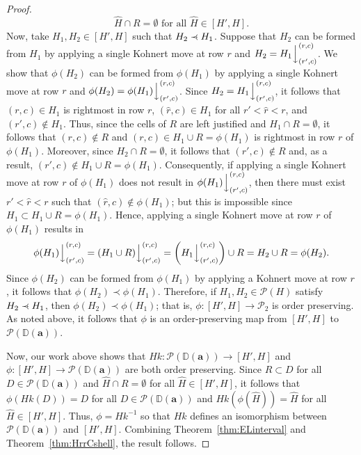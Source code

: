 \documentclass[letterpaper,10pt]{article}
\newcommand{\ldownarrow}{\Big\downarrow}
\newcommand{\precdot}{\prec\mathrel{\mkern-5mu}\mathrel{\cdot}}
\begin{document}
\begin{proof}
    $$\widehat{H}\cap R=\emptyset\text{ for all }\widehat{H}\in [H',H].$$ Now, take $H_1,H_2\in [H',H]$ such that $H_2\precdot H_1$. Suppose that $H_2$ can be formed from $H_1$ by applying a single Kohnert move at row $r$ and $H_2=H_1\ldownarrow^{(r,c)}_{(r',c)}$. We show that $\phi(H_2)$ can be formed from $\phi(H_1)$ by applying a single Kohnert move at row $r$ and $\phi(H_2)=\phi(H_1)\ldownarrow^{(r,c)}_{(r',c)}$. Since $H_2=H_1\ldownarrow^{(r,c)}_{(r',c)}$, it follows that $(r,c)\in H_1$ is rightmost in row $r$, $(\widehat{r},c)\in H_1$ for all $r'<\widehat{r}<r$, and $(r',c)\notin H_1$. Thus, since the cells of $R$ are left justified and $H_1\cap R=\emptyset$, it follows that $(r,c)\notin R$ and $(r,c)\in H_1\cup R= \phi(H_1)$ is rightmost in row $r$ of $\phi(H_1)$. Moreover, since $H_2\cap R=\emptyset$, it follows that $(r',c)\notin R$ and, as a result, $(r',c)\notin H_1\cup R=\phi(H_1)$. Consequently, if applying a single Kohnert move at row $r$ of $\phi(H_1)$ does not result in $\phi(H_1)\ldownarrow^{(r,c)}_{(r',c)}$, then there must exist $r'<\widehat{r}<r$ such that $(\widehat{r},c)\notin \phi(H_1)$; but this is impossible since $H_1\subset H_1\cup R=\phi(H_1)$. Hence, applying a single Kohnert move at row $r$ of $\phi(H_1)$ results in $$\phi(H_1)\ldownarrow^{(r,c)}_{(r',c)}=(H_1\cup R)\ldownarrow^{(r,c)}_{(r',c)}=\left(H_1\ldownarrow^{(r,c)}_{(r',c)}\right)\cup R=H_2\cup R=\phi(H_2).$$ Since $\phi(H_2)$ can be formed from $\phi(H_1)$ by applying a Kohnert move at row $r$, it follows that $\phi(H_2)\prec \phi(H_1)$. Therefore, if $H_1,H_2\in \mathcal{P}(H)$ satisfy $H_2\precdot H_1$, then $\phi(H_2)\prec \phi(H_1)$; that is, $\phi:[H',H]\to\mathcal{P}_2$ is order preserving. As noted above, it follows that $\phi$ is an order-preserving map from $[H',H]$ to $\mathcal{P}(\mathbb{D}(\mathbf{a}))$.

    Now, our work above shows that $Hk:\mathcal{P}(\mathbb{D}(\mathbf{a}))\to [H',H]$ and $\phi:[H',H]\to \mathcal{P}(\mathbb{D}(\mathbf{a}))$ are both order preserving. Since $R\subset D$ for all $D\in \mathcal{P}(\mathbb{D}(\mathbf{a}))$ and $\widehat{H}\cap R=\emptyset$ for all $\widehat{H}\in [H',H]$, it follows that $\phi(Hk(D))=D$ for all $D\in \mathcal{P}(\mathbb{D}(\mathbf{a}))$ and $Hk(\phi(\widehat{H}))=\widehat{H}$ for all $\widehat{H}\in [H',H]$. Thus, $\phi=Hk^{-1}$ so that $Hk$ defines an isomorphism between $\mathcal{P}(\mathbb{D}(\mathbf{a}))$ and $[H',H]$. Combining Theorem~\ref{thm:ELinterval} and Theorem~\ref{thm:HrrCshell}, the result follows.
\end{proof}
\end{document}
